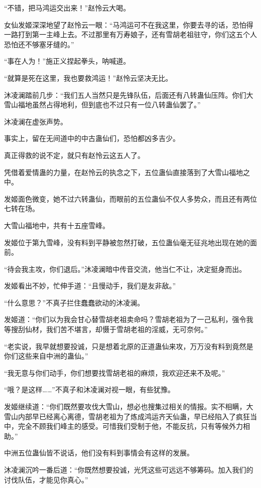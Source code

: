 \begin{this_body}
“不错，把马鸿运交出来！”赵怜云大喝。

女仙发姬深深地望了赵怜云一眼：“马鸿运可不在我这里，你要去寻的话，恐怕得一路打到第一主峰上去。不过那里有万寿娘子，还有雪胡老祖驻守，你们这五个人恐怕还不够塞牙缝的。”

“事在人为！”施正义捏起拳头，呐喊道。

“就算是死在这里，我也要救鸿运！”赵怜云坚决无比。

沐凌澜踏前几步：“我们五人当然只是先锋队伍，后面还有八转蛊仙压阵。你们大雪山福地虽然占得地利，但到底也不过只有一位八转蛊仙罢了。”

沐凌澜在虚张声势。

事实上，留在无间道中的中古蛊仙们，恐怕都凶多吉少。

真正得救的说不定，就只有赵怜云这五人了。

凭借着爱情蛊的力量，在赵怜云的执念之下，五位蛊仙直接落到了大雪山福地之中。

发姬面色微变，她不过六转蛊仙，而眼前的五位蛊仙不仅人多势众，而且还有两位七转在场。

大雪山福地中，共有十五座雪峰。

发姬位于第九雪峰，没有料到平静被忽然打破，五位蛊仙毫无征兆地出现在她的面前。

“待会我主攻，你们退后。”沐凌澜暗中传音交流，他当仁不让，决定挺身而出。

发姬看出不妙，忙伸手道：“且慢动手，我们是友非敌。”

“什么意思？”不真子拦住蠢蠢欲动的沐凌澜。

发姬道：“你们以为我会甘心替雪胡老祖卖命吗？雪胡老祖为了一己私利，强令我等搜刮仙材，我们苦不堪言，却慑于雪胡老祖的淫威，无可奈何。”

“老实说，我早就想要投诚，只是想着北原的正道蛊仙来攻，万万没有料到竟然是你们这些来自中洲的蛊仙。”

“我无意与你们动手，你们想要找雪胡老祖的麻烦，我欢迎还来不及呢。”

“哦？是这样……”不真子和沐凌澜对视一眼，有些犹豫。

发姬继续道：“你们既然要攻伐大雪山，想必也搜集过相关的情报。实不相瞒，大雪山内部早已经离心离德，雪胡老祖为了炼成鸿运齐天仙蛊，早已经陷入了疯狂当中，完全不顾我们峰主的感受。可惜我们受制于他，不能反抗，只有等候外力相助。”

中洲五位蛊仙皆不说话，他们没有料到事情会有这样的发展。

沐凌澜沉吟一番后道：“你既然想要投诚，光凭这些可远远不够筹码。加入我们的讨伐队伍，才能见你真心。”


\end{this_body}
